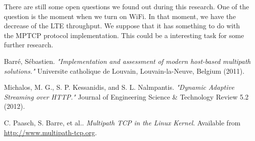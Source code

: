 \documentclass{llncs}
\begin{document}
There are still some open questions we found out during this research. One of the question is the moment when we turn on WiFi. In that moment, we have the decrease of the LTE throughput. We suppose that it has something to do with the MPTCP protocol implementation. This could be a interesting task for some further research.



\begin{thebibliography}{1}
Barré, Sébastien. \emph{"Implementation and assessment of modern host-based multipath solutions." } Universite catholique de Louvain, Louvain-la-Neuve, Belgium (2011).

Michalos, M. G., S. P. Kessanidis, and S. L. Nalmpantis. \emph{"Dynamic Adaptive Streaming over HTTP."} Journal of Engineering Science \& Technology Review 5.2 (2012).

C. Paasch, S. Barre, et al.. \emph{Multipath TCP in the Linux Kernel}. Available from \url{http://www.multipath-tcp.org}.


\end{thebibliography}
\end{document}
